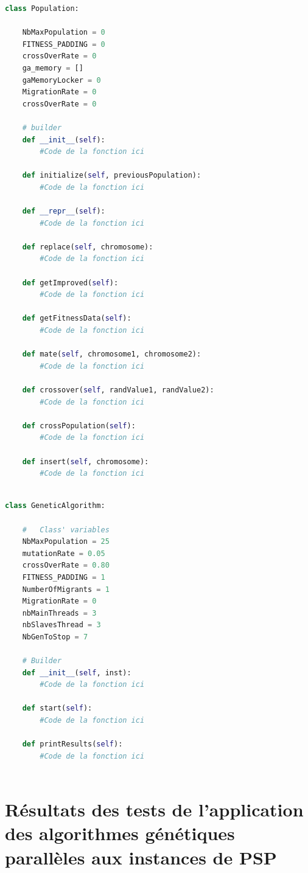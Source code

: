 \documentclass[12pt,a4paper]{article}
\begin{document}
    \begin{lstlisting}[language=python]
class Population:

	NbMaxPopulation = 0
	FITNESS_PADDING = 0
	crossOverRate = 0
	ga_memory = []
	gaMemoryLocker = 0
	MigrationRate = 0
	crossOverRate = 0
	
	# builder 
	def __init__(self):
		#Code de la fonction ici
	
	def initialize(self, previousPopulation):
		#Code de la fonction ici
	
	def __repr__(self):
		#Code de la fonction ici
	
	def replace(self, chromosome):
		#Code de la fonction ici
	
	def getImproved(self):
		#Code de la fonction ici
	
	def getFitnessData(self):
		#Code de la fonction ici
	
	def mate(self, chromosome1, chromosome2):
		#Code de la fonction ici
	
	def crossover(self, randValue1, randValue2):
		#Code de la fonction ici
	
	def crossPopulation(self):
		#Code de la fonction ici
	
	def insert(self, chromosome):
		#Code de la fonction ici
		
    \end{lstlisting}
    
    \begin{lstlisting}[language=python]
class GeneticAlgorithm:

	#	Class' variables
	NbMaxPopulation = 25
	mutationRate = 0.05
	crossOverRate = 0.80
	FITNESS_PADDING = 1
	NumberOfMigrants = 1
	MigrationRate = 0 
	nbMainThreads = 3
	nbSlavesThread = 3
	NbGenToStop = 7

	# Builder
	def __init__(self, inst):
		#Code de la fonction ici
	
	def start(self):
		#Code de la fonction ici
	
	def printResults(self):
		#Code de la fonction ici
		
    \end{lstlisting}
	
	\newpage
	\section{Résultats des tests de l'application des algorithmes génétiques parallèles aux instances de PSP}
	
	\newpage
\end{document}
